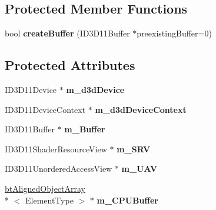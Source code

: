 \subsection*{Protected Member Functions}
\begin{DoxyCompactItemize}
\item 
\hypertarget{classbt_d_x11_buffer_aa1707814ad282663e3e8484fd87811f1}{bool {\bfseries create\+Buffer} (I\+D3\+D11\+Buffer $\ast$preexisting\+Buffer=0)}\label{classbt_d_x11_buffer_aa1707814ad282663e3e8484fd87811f1}

\end{DoxyCompactItemize}
\subsection*{Protected Attributes}
\begin{DoxyCompactItemize}
\item 
\hypertarget{classbt_d_x11_buffer_a6a0ca767471bdb0344286829944fd02a}{I\+D3\+D11\+Device $\ast$ {\bfseries m\+\_\+d3d\+Device}}\label{classbt_d_x11_buffer_a6a0ca767471bdb0344286829944fd02a}

\item 
\hypertarget{classbt_d_x11_buffer_a86472b5ec226335575965024243153f6}{I\+D3\+D11\+Device\+Context $\ast$ {\bfseries m\+\_\+d3d\+Device\+Context}}\label{classbt_d_x11_buffer_a86472b5ec226335575965024243153f6}

\item 
\hypertarget{classbt_d_x11_buffer_aa690c200d948619c8dcbf05015691b96}{I\+D3\+D11\+Buffer $\ast$ {\bfseries m\+\_\+\+Buffer}}\label{classbt_d_x11_buffer_aa690c200d948619c8dcbf05015691b96}

\item 
\hypertarget{classbt_d_x11_buffer_ae422ca7810748906a36b94b065e2ec56}{I\+D3\+D11\+Shader\+Resource\+View $\ast$ {\bfseries m\+\_\+\+S\+R\+V}}\label{classbt_d_x11_buffer_ae422ca7810748906a36b94b065e2ec56}

\item 
\hypertarget{classbt_d_x11_buffer_a1cfbe7ebef4f52c1013e5f6dda444a8b}{I\+D3\+D11\+Unordered\+Access\+View $\ast$ {\bfseries m\+\_\+\+U\+A\+V}}\label{classbt_d_x11_buffer_a1cfbe7ebef4f52c1013e5f6dda444a8b}

\item 
\hypertarget{classbt_d_x11_buffer_a05a071f12cf620c555ec793053e54812}{\hyperlink{classbt_aligned_object_array}{bt\+Aligned\+Object\+Array}\\*
$<$ Element\+Type $>$ $\ast$ {\bfseries m\+\_\+\+C\+P\+U\+Buffer}}\label{classbt_d_x11_buffer_a05a071f12cf620c555ec793053e54812}


\end{DoxyCompactItemize}
